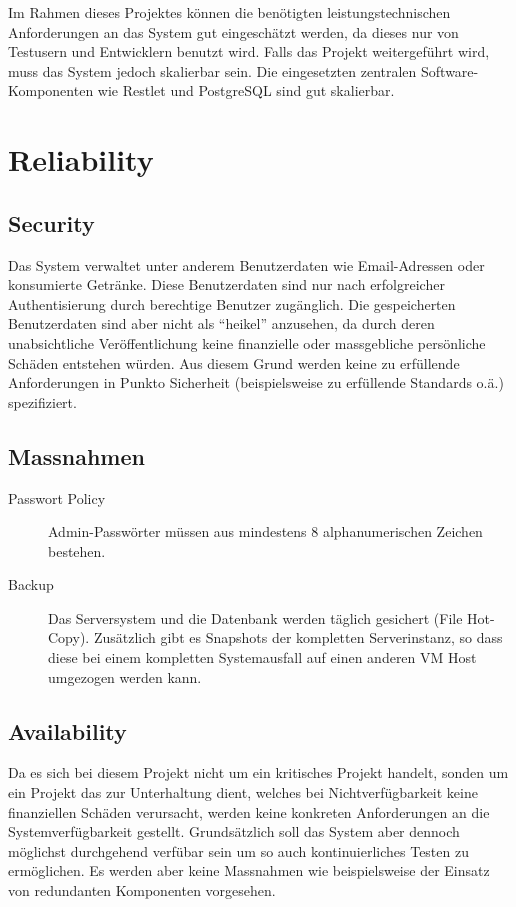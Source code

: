 \documentclass[10pt,a4paper]{scrartcl}
\begin{document}
Im Rahmen dieses Projektes können die benötigten leistungstechnischen Anforderungen an das System gut eingeschätzt werden, da dieses nur von Testusern und Entwicklern benutzt wird. Falls das Projekt weitergeführt wird, muss das System jedoch skalierbar sein. Die eingesetzten zentralen Software-Komponenten wie Restlet und PostgreSQL sind gut skalierbar\cite{smith2010postgresql}.


\section{Reliability}

	\subsection{Security}

	Das System verwaltet unter anderem Benutzerdaten wie Email-Adressen oder konsumierte Getränke. Diese Benutzerdaten sind nur nach erfolgreicher Authentisierung durch berechtige Benutzer zugänglich. Die gespeicherten Benutzerdaten sind aber nicht als ``heikel'' anzusehen, da durch deren unabsichtliche Veröffentlichung keine finanzielle oder massgebliche persönliche Schäden entstehen würden. Aus diesem Grund werden keine zu erfüllende Anforderungen in Punkto Sicherheit (beispielsweise zu erfüllende Standards o.ä.) spezifiziert.

	\subsection{Massnahmen}

	\begin{description}
		\item[Passwort Policy]
			Admin-Passwörter müssen aus mindestens 8 alphanumerischen Zeichen bestehen.
		\item[Backup]
			Das Serversystem und die Datenbank werden täglich gesichert (File Hot-Copy).
			Zusätzlich gibt es Snapshots der kompletten Serverinstanz, so dass diese bei einem kompletten Systemausfall auf einen anderen VM Host umgezogen werden kann.
	\end{description}

	\subsection{Availability}

	Da es sich bei diesem Projekt nicht um ein kritisches Projekt handelt, sonden um ein Projekt das zur Unterhaltung dient, welches bei Nichtverfügbarkeit keine finanziellen Schäden verursacht, werden keine konkreten Anforderungen an die Systemverfügbarkeit gestellt. Grundsätzlich soll das System aber dennoch möglichst durchgehend verfübar sein um so auch kontinuierliches Testen zu ermöglichen. Es werden aber keine Massnahmen wie beispielsweise der Einsatz von redundanten Komponenten vorgesehen.
\end{document}
